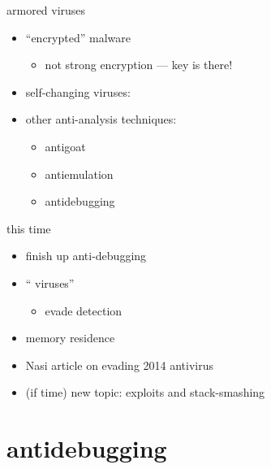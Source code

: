 \begin{frame}{armored viruses}
    \begin{itemize}
    \item ``encrypted'' malware
        \begin{itemize}
        \item not strong encryption --- key is there!
        \end{itemize}
    \item self-changing viruses:
    \item other anti-analysis techniques:   
        \begin{itemize}
        \item antigoat
        \item antiemulation
        \item antidebugging
        \end{itemize}
    \end{itemize}
\end{frame}

\begin{frame}{this time}
    \begin{itemize}
    \item finish up anti-debugging
    \item `` viruses''
        \begin{itemize}
        \item evade  detection
        \end{itemize}
    \item memory residence
    \item Nasi article on evading 2014 antivirus
    \vspace{.5cm}
    \item (if time) new topic: exploits and stack-smashing
    \end{itemize}
\end{frame}

\section{antidebugging}

